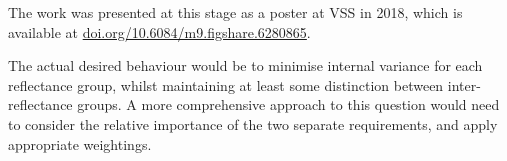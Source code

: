 \documentclass{article}
\begin{document}
The work was presented at this stage as a poster at VSS in 2018, which is available at \url{doi.org/10.6084/m9.figshare.6280865}.

The actual desired behaviour would be to minimise internal variance for each reflectance group, whilst maintaining at least some distinction between inter-reflectance groups. A more comprehensive approach to this question would need to consider the relative importance of the two separate requirements, and apply appropriate weightings.



\end{document}
